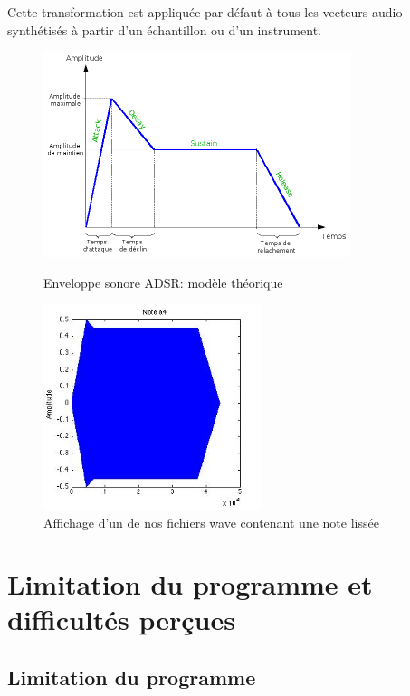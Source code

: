 \documentclass[10pt,a4paper]{article}
\begin{document}
Cette transformation est appliquée par défaut à tous les vecteurs audio synthétisés à partir d'un échantillon ou d'un instrument.

\begin{figure}[h!]
    \begin{minipage}[b]{0.4\linewidth}
        \centering \includegraphics[height=6cm]{images/ADSR.png}
        \caption{Enveloppe sonore ADSR: modèle théorique}
    \end{minipage}\hfill
    \begin{minipage}[b]{0.48\linewidth}
        \centering \includegraphics[height=6cm]{images/OurADSR.jpg}
        \caption{Affichage d'un de nos fichiers wave contenant une note lissée}
    \end{minipage}
\end{figure}



\section{Limitation du programme et difficultés perçues}

\subsection{Limitation du programme}
\end{document}
